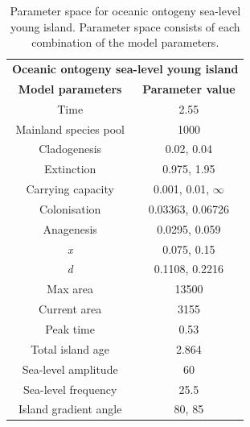 \begin{table}[ht]
    \centering
    \caption{Parameter space for oceanic ontogeny sea-level young island. Parameter space consists of each combination of the model parameters.}
    \begin{tabular}{ c | c }
        \multicolumn{2}{c}{\textbf{Oceanic ontogeny sea-level young island}} \\
        \textbf{Model parameters} & \textbf{Parameter value} \\ 
        \hline
        \hline
        Time & 2.55 \\
        \hline
        Mainland species pool & 1000 \\
        \hline
        Cladogenesis & 0.02, 0.04 \\
        \hline
        Extinction & 0.975, 1.95 \\
        \hline
        Carrying capacity & 0.001, 0.01, $\infty$ \\
        \hline
        Colonisation & 0.03363, 0.06726 \\
        \hline
        Anagenesis & 0.0295, 0.059 \\
        \hline
        \textit{x} & 0.075, 0.15 \\
        \hline
        \textit{d} & 0.1108, 0.2216 \\
        \hline
        Max area & 13500 \\
        \hline
        Current area & 3155 \\
        \hline
        Peak time & 0.53 \\
        \hline
        Total island age & 2.864 \\
        \hline
        Sea-level amplitude & 60 \\
        \hline
        Sea-level frequency & 25.5 \\
        \hline
        Island gradient angle & 80, 85 \\
    \end{tabular}
    \label{tab:oceanic_ontogeny_sea_level_young}
\end{table}

